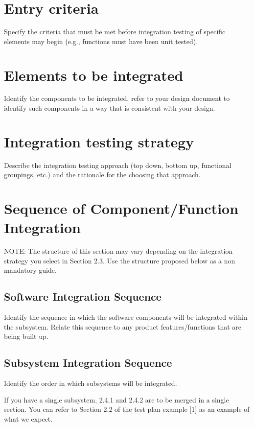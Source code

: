 \section{Entry criteria}
Specify the criteria that must be met before integration testing of specific elements may begin (e.g., functions must have been unit tested).

\section{Elements to be integrated}
Identify the components to be integrated, refer to your design document to identify such components in a way that is consistent with your design.

\section{Integration testing strategy}
Describe the integration testing approach (top down, bottom up, functional groupings, etc.) and the rationale for the choosing that approach.

\section{Sequence of Component/Function Integration}
NOTE: The structure of this section may vary depending on the integration strategy you select in Section 2.3. Use the structure proposed below as a non mandatory guide.

	\subsection{Software Integration Sequence}
	Identify the sequence in which the software components will be integrated within the subsystem. Relate this sequence to any product features/functions that are being built up.
	\subsection{Subsystem Integration Sequence}
	Identify the order in which subsystems will be integrated.

If you have a single subsystem, 2.4.1 and 2.4.2 are to be merged in a single section. You can refer to Section 2.2 of the test plan example [1] as an example of what we expect.
